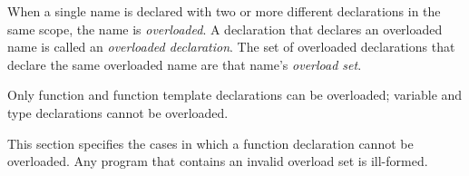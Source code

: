 
\p When a single name is declared with two or more different declarations in the
same scope, the name is \textit{overloaded}. A declaration that declares an
overloaded name is called an \textit{overloaded declaration}. The set of
overloaded declarations that declare the same overloaded name are that name's
\textit{overload set}.

\p Only function and function template declarations can be overloaded; variable and type
declarations cannot be overloaded.


\p This section specifies the cases in which a function declaration cannot be
overloaded. Any program that contains an invalid overload set is ill-formed.

